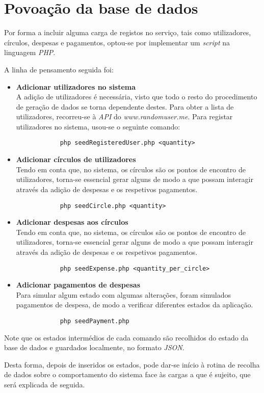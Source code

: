 \section{Povoação da base de dados}

Por forma a incluir alguma carga de registos no serviço, tais como utilizadores, círculos, despesas e pagamentos, optou-se por implementar um \emph{script} na linguagem \emph{PHP}.


A linha de pensamento seguida foi:
\begin{itemize}
	\item \textbf{Adicionar utilizadores no sistema} \\
		\indent A adição de utilizadores é necessária, visto que todo o resto do procedimento de geração de dados se torna dependente destes. Para obter a lista de utilizadores, recorreu-se à \emph{API} do \emph{www.randomuser.me}. Para registar utilizadores no sistema, usou-se o seguinte comando:
		\begin{verbatim}
			php seedRegisteredUser.php <quantity>
		\end{verbatim}

	\item \textbf{Adicionar círculos de utilizadores} \\
		\indent Tendo em conta que, no sistema, os círculos são os pontos de encontro de utilizadores, torna-se essencial gerar alguns de modo a que possam interagir através da adição de despesas e os respetivos pagamentos.
		\begin{verbatim}
			php seedCircle.php <quantity>
		\end{verbatim}

	\item \textbf{Adicionar despesas aos círculos} \\
		\indent Tendo em conta que, no sistema, os círculos são os pontos de encontro de utilizadores, torna-se essencial gerar alguns de modo a que possam interagir através da adição de despesas e os respetivos pagamentos.
		\begin{verbatim}
			php seedExpense.php <quantity_per_circle>
		\end{verbatim}

	\item \textbf{Adicionar pagamentos de despesas} \\
		\indent Para simular algum estado com algumas alterações, foram simulados pagamentos de despesa, de modo a verificar diferentes estados da aplicação.
		\begin{verbatim}
			php seedPayment.php
		\end{verbatim}
\end{itemize}

Note que os estados intermédios de cada comando são recolhidos do estado da base de dados e guardados localmente, no formato \emph{JSON}.

Desta forma, depois de inseridos os estados, pode dar-se início à rotina de recolha de dados sobre o comportamento do sistema face às cargas a que é sujeito, que será explicada de seguida.
